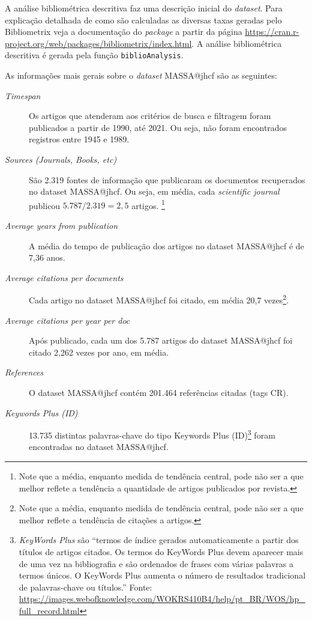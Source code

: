 A análise bibliométrica descritiva faz uma descrição inicial do \textit{dataset}. Para explicação detalhada de como são calculadas as diversas taxas geradas pelo Bibliometrix veja a documentação do \textit{package} a partir da página \url{https://cran.r-project.org/web/packages/bibliometrix/index.html}. A análise bibliométrica descritiva é gerada pela função \texttt{biblioAnalysis}.

As informações mais gerais sobre o \textit{dataset} MASSA@jhcf são as seguintes:
\begin{description}
    \item [\textit{Timespan}] Os artigos que atenderam aos critérios de busca e filtragem foram publicados a partir de 1990, até 2021. Ou seja, não foram encontrados registros entre 1945 e 1989.
    \item [\textit{Sources (Journals, Books, etc)}] São 2.319 fontes de informação que publicaram os documentos recuperados no dataset MASSA@jhcf. Ou seja, em média, cada \textit{scientific journal} publicou $5.787/2.319=2,5$ artigos. \footnote{Note que a média, enquanto medida de tendência central, pode não ser a que melhor reflete a tendência a quantidade de artigos publicados por revista.}
    \item [\textit{Average years from publication}] A média do tempo de publicação dos artigos no dataset MASSA@jhcf é de 7,36 anos.
    \item [\textit{Average citations per documents}] Cada artigo no dataset MASSA@jhcf foi citado, em média 20,7 vezes\footnote{Note que a média, enquanto medida de tendência central, pode não ser a que melhor reflete a tendência de  citações a artigos.}.
    \item [\textit{Average citations per year per doc}] Após publicado, cada um dos 5.787 artigos do dataset MASSA@jhcf  foi citado 2,262 vezes por ano, em média.
    \item [\textit{References}] O dataset MASSA@jhcf contém 201.464 referências citadas (tags CR).
    \item [\textit{Keywords Plus (ID)}] 13.735 distintas palavras-chave do tipo Keywords Plus (ID)\footnote{\textit{KeyWords Plus} são ``termos de índice gerados automaticamente a partir dos títulos de artigos citados. Os termos do KeyWords Plus devem aparecer mais de uma vez na bibliografia e são ordenados de frases com várias palavras a termos únicos. O KeyWords Plus aumenta o número de resultados tradicional de palavras-chave ou títulos.'' Fonte: \url{https://images.webofknowledge.com/WOKRS410B4/help/pt_BR/WOS/hp_full_record.html}} foram encontradas no dataset MASSA@jhcf. 

\end{description}
